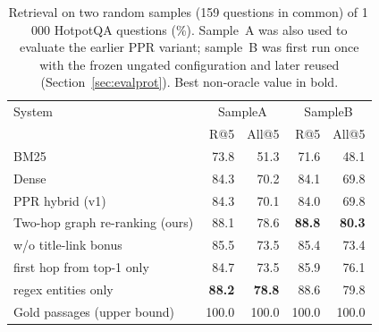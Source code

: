 \begin{table}[t]
\centering
\small
\caption{Retrieval on two random samples (159 questions in common) of 1\,000 HotpotQA questions (\%). Sample~A was also used to evaluate the earlier PPR variant; sample~B was first run once with the frozen ungated configuration and later reused (Section~\ref{sec:evalprot}). Best non-oracle value in bold.}
\label{tab:retr2}
\begin{tabular}{lrrrr}
\toprule
System & \multicolumn{2}{c}{SampleA} & \multicolumn{2}{c}{SampleB} \\
& R@5 & All@5 & R@5 & All@5 \\
\midrule
BM25 & 73.8 & 51.3 & 71.6 & 48.1 \\
Dense & 84.3 & 70.2 & 84.1 & 69.8 \\
PPR hybrid (v1) & 84.3 & 70.1 & 84.0 & 69.8 \\
Two-hop graph re-ranking (ours) & 88.1 & 78.6 & \textbf{88.8} & \textbf{80.3} \\
w/o title-link bonus & 85.5 & 73.5 & 85.4 & 73.4 \\
first hop from top-1 only & 84.7 & 73.5 & 85.9 & 76.1 \\
regex entities only & \textbf{88.2} & \textbf{78.8} & 88.6 & 79.8 \\
Gold passages (upper bound) & 100.0 & 100.0 & 100.0 & 100.0 \\
\bottomrule
\end{tabular}
\end{table}